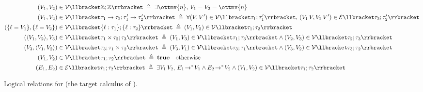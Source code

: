 \begin{figure}
\begin{small}
\begin{align*}
  (V_1, V_2) &\in \mathcal{V} \llbracket  \mathbb{Z} ;  \mathbb{Z}  \rrbracket \; \triangleq \; \exists \ottmv{n},\, V_1 = V_2 = \ottmv{n} \\
  (V_1, V_2) &\in \mathcal{V} \llbracket \tau_1 \rightarrow \tau_2; \tau'_1 \rightarrow \tau'_2 \rrbracket \; \triangleq \; \forall (V, V') \in \mathcal{V} \llbracket \tau_1; \tau_1' \rrbracket,\, (V_1\,V, V_2\,V') \in \mathcal{E} \llbracket \tau_2; \tau'_2 \rrbracket \\
  (\{\ell = V_1\}, \{\ell = V_2\}) &\in \mathcal{V} \llbracket \{\ell : \tau_1\}; \{\ell : \tau_2\} \rrbracket \; \triangleq \; (V_1, V_2) \in \mathcal{V} \llbracket \tau_1; \tau_2 \rrbracket \\
  (\langle V_1, V_2 \rangle, V_3) &\in \mathcal{V} \llbracket \tau_1 \times \tau_2; \tau_3 \rrbracket \; \triangleq \; (V_1, V_3) \in \mathcal{V} \llbracket \tau_1; \tau_3 \rrbracket \land (V_2, V_3) \in \mathcal{V} \llbracket \tau_2; \tau_3 \rrbracket \\
  (V_3, \langle V_1, V_2 \rangle) &\in \mathcal{V} \llbracket \tau_3; \tau_1 \times \tau_2 \rrbracket \; \triangleq \; (V_3, V_1) \in \mathcal{V} \llbracket \tau_3; \tau_1 \rrbracket \land (V_3, V_2) \in \mathcal{V} \llbracket \tau_3; \tau_2 \rrbracket \\
  (V_1, V_2) &\in \mathcal{V} \llbracket \tau_1; \tau_2 \rrbracket \; \triangleq \;  \mathbf{true}  \quad \text{otherwise} \\
  (E_1, E_2) &\in \mathcal{E} \llbracket \tau_1; \tau_2 \rrbracket \; \triangleq \; \exists V_1\,V_2,\, E_1 \! \rightarrow^* \! V_1 \land E_2 \! \rightarrow^* \! V_2 \land (V_1, V_2) \in \mathcal{V} \llbracket \tau_1; \tau_2 \rrbracket
\end{align*}
\end{small}
\caption{Logical relations for \lambdac (the target calculus of \necolus).}\label{fig:logical-rel-lc}
\end{figure}

